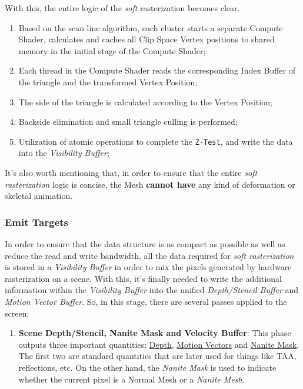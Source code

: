 \documentclass[10pt,journal,compsoc]{IEEEtran}
\begin{document}
\par With this, the entire logic of the \textit{soft} rasterization becomes clear.

\begin{enumerate}
    \item Based on the scan line algorithm, each cluster starts a separate Compute Shader, calculates and caches all Clip Space Vertex positions to shared memory in the initial stage of the Compute Shader;
    \item Each thread in the Compute Shader reads the corresponding Index Buffer of the triangle and the transformed Vertex Position; 
    \item The side of the triangle is calculated according to the Vertex Position;
    \item Backside elimination and small triangle culling is performed;
    \item Utilization of atomic operations to complete the \texttt{Z-Test}, and write the data into the \textit{Visibility Buffer};
\end{enumerate}

\par It's also worth mentioning that, in order to ensure that the entire \textit{soft rasterization} logic is concise, the Mesh \textbf{cannot have} any kind of deformation or skeletal animation.
 
\subsubsection{Emit Targets}

\par In order to ensure that the data structure is as compact as possible as well as reduce the read and write bandwidth, all the data required for \textit{soft rasterization} is stored in a \textit{Visibility Buffer} in order to mix the pixels generated by hardware rasterization on a scene. With this, it's finally needed to write the additional information within the \textit{Visibility Buffer} into the unified \textit{Depth/Stencil Buffer} and \textit{Motion Vector Buffer}. So, in this stage, there are several passes applied to the screen:

\begin{enumerate}
    \item \textbf{Scene Depth/Stencil, Nanite Mask and Velocity Buffer}: This phase outputs three important quantities: \underline{Depth}, \underline{Motion Vectors} and \underline{Nanite Mask}. The first two are standard quantities that are later used for things like TAA, reflections, etc. On the other hand, the \textit{Nanite Mask} is used to indicate whether the current pixel is a Normal Mesh or a \textit{Nanite Mesh}.
\end{enumerate} 
\end{document}
